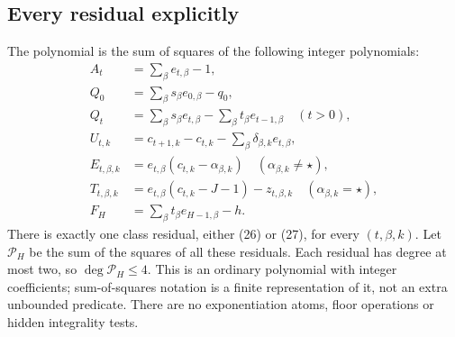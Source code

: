 \subsection{Every residual explicitly}
The polynomial is the sum of squares of the following integer polynomials:
\begin{align}
 A_t&=\sum_\beta e_{t,\beta}-1,                                      \tag{22}\\
 Q_0&=\sum_\beta s_\beta e_{0,\beta}-q_0,                            \tag{23}\\
 Q_t&=\sum_\beta s_\beta e_{t,\beta}
          -\sum_\beta t_\beta e_{t-1,\beta}\quad(t>0),              \tag{24}\\
 U_{t,k}&=c_{t+1,k}-c_{t,k}-\sum_\beta\delta_{\beta,k}e_{t,\beta},   \tag{25}\\
 E_{t,\beta,k}&=e_{t,\beta}(c_{t,k}-\alpha_{\beta,k})
           \quad(\alpha_{\beta,k}\ne\star),                       \tag{26}\\
 T_{t,\beta,k}&=e_{t,\beta}(c_{t,k}-J-1)-z_{t,\beta,k}
           \quad(\alpha_{\beta,k}=\star),                         \tag{27}\\
 F_H&=\sum_\beta t_\beta e_{H-1,\beta}-h.                           \tag{28}
\end{align}
There is exactly one class residual, either (26) or (27), for every
$(t,\beta,k)$. Let $\mathcal P_H$ be the sum of the squares of all these
residuals. Each residual has degree at most two, so $\deg\mathcal P_H\le4$.
This is an ordinary polynomial with integer coefficients; sum-of-squares
notation is a finite representation of it, not an extra unbounded predicate.
There are no exponentiation atoms, floor operations or hidden integrality
tests.

